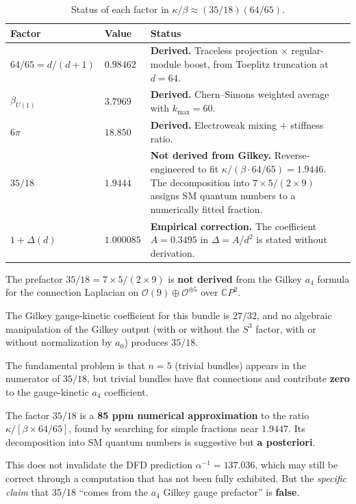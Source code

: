 \documentclass[12pt,a4paper]{article}
\theoremstyle{definition}
\begin{document}
\begin{table}[h]
\centering
\renewcommand{\arraystretch}{1.4}
\caption{Status of each factor in $\kappa/\beta \approx (35/18)(64/65)$.}
\begin{tabular}{llp{6cm}}
\toprule
\textbf{Factor} & \textbf{Value} & \textbf{Status} \\
\midrule
$64/65 = d/(d+1)$ & $0.98462$ &
\textcolor{green!60!black}{\textbf{Derived.}}
Traceless projection $\times$ regular-module boost, from Toeplitz truncation
at $d = 64$. \\
$\beta_{U(1)}$ & $3.7969$ &
\textcolor{green!60!black}{\textbf{Derived.}}
Chern--Simons weighted average with $k_{\max} = 60$. \\
$6\pi$ & $18.850$ &
\textcolor{green!60!black}{\textbf{Derived.}}
Electroweak mixing $+$ stiffness ratio. \\
$35/18$ & $1.944\overline{4}$ &
\textcolor{red!70!black}{\textbf{Not derived from Gilkey.}}
Reverse-engineered to fit $\kappa/(\beta \cdot 64/65) = 1.9446$.
The decomposition into $7 \times 5/(2 \times 9)$ assigns SM quantum
numbers to a numerically fitted fraction. \\
$1 + \Delta(d)$ & $1.000085$ &
\textcolor{orange!70!black}{\textbf{Empirical correction.}}
The coefficient $A = 0.3495$ in $\Delta = A/d^2$ is stated without
derivation. \\
\bottomrule
\end{tabular}
\end{table}

\begin{tcolorbox}[colback=blue!5!white, colframe=blue!50!black,
  title=\textbf{Final Conclusion}]

The prefactor $35/18 = 7 \times 5/(2 \times 9)$ is \textbf{not derived}
from the Gilkey $a_4$ formula for the connection Laplacian on
$\mathcal{O}(9) \oplus \mathcal{O}^{\oplus 5}$ over $\mathbb{C}P^2$.

\medskip\noindent
The Gilkey gauge-kinetic coefficient for this bundle is $27/32$, and
no algebraic manipulation of the Gilkey output (with or without the
$S^3$ factor, with or without normalization by $a_0$) produces $35/18$.

\medskip\noindent
The fundamental problem is that $n = 5$ (trivial bundles) appears in
the numerator of $35/18$, but trivial bundles have flat connections
and contribute \textbf{zero} to the gauge-kinetic $a_4$ coefficient.

\medskip\noindent
The factor $35/18$ is a \textbf{85 ppm numerical approximation} to
the ratio $\kappa/[\beta \times 64/65]$, found by searching for simple
fractions near $1.9447$.  Its decomposition into SM quantum numbers
is suggestive but \textbf{a posteriori}.

\medskip\noindent
This does not invalidate the DFD prediction $\alpha^{-1} = 137.036$,
which may still be correct through a computation that has not been
fully exhibited.  But the \emph{specific claim} that 35/18 ``comes from
the $a_4$ Gilkey gauge prefactor'' is \textbf{false}.
\end{tcolorbox}
\end{document}
